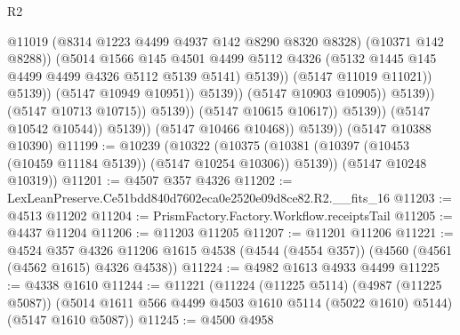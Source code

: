 \begin{lexlean}{R2}
\begin{coremodule}
                                                  @11019
                                                  (@8314 @1223 @4499 @4937 @142 @8290 @8320 @8328)
                                                  (@10371 @142 @8288))
                                                (@5014
                                                  @1566
                                                  @145
                                                  @4501
                                                  @4499
                                                  @5112
                                                  @4326
                                                  (@5132
                                                    @1445
                                                    @145
                                                    @4499
                                                    @4499
                                                    @4326
                                                    @5112
                                                    @5139
                                                    @5141)
                                                  @5139))
                                              (@5147 @11019 @11021))
                                            @5139))
                                        (@5147 @10949 @10951))
                                      @5139))
                                  (@5147 @10903 @10905))
                                @5139))
                            (@5147 @10713 @10715))
                          @5139))
                      (@5147 @10615 @10617))
                    @5139))
                (@5147 @10542 @10544))
              @5139))
          (@5147 @10466 @10468))
        @5139))
    (@5147 @10388 @10390)
@11199 := @10239
    (@10322
      (@10375 (@10381 (@10397 (@10453 (@10459 @11184 @5139)) (@5147 @10254 @10306)) @5139))
      (@5147 @10248 @10319))
@11201 := @4507 @357 @4326
@11202 := LexLeanPreserve.Ce51bdd840d7602eca0e2520e09d8ce82.R2.__fits_16
@11203 := @4513 @11202
@11204 := PrismFactory.Factory.Workflow.receiptsTail
@11205 := @4437 @11204
@11206 := @11203 @11205
@11207 := @11201 @11206
@11221 := @4524
    @357
    @4326
    @11206
    @1615
    @4538
    (@4544 (@4554 @357))
    (@4560 (@4561 (@4562 @1615) @4326 @4538))
@11224 := @4982 @1613 @4933 @4499
@11225 := @4338 @1610
@11244 := @11221
    (@11224
      (@11225 @5114)
      (@4987 (@11225 @5087))
      (@5014 @1611 @566 @4499 @4503 @1610 @5114 (@5022 @1610) @5144)
      (@5147 @1610 @5087))
@11245 := @4500 @4958

\end{coremodule}
\end{lexlean}
